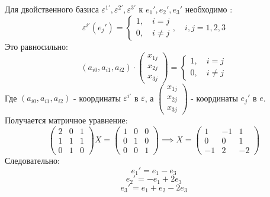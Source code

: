 \documentclass[a4paper]{article}
\newcommand{\mat}[1]{\begin{pmatrix} #1 \end{pmatrix}}
\newcommand{\case}[1]{\begin{cases} #1 \end{cases}}
\begin{document}
\begin{enumerate}
\begin{enumerate}
        Для двойственного базиса $ \varepsilon^{1'}, \varepsilon^{2'}, \varepsilon^{3'} $ к $e_1', e_2', e_3' $ необходимо :
        $$
        \varepsilon^{i'}(e_j') = \case{1, \quad i=j\\0, \quad i\neq j}, \quad i,j = 1, 2, 3
        $$
        Это равносильно:
        $$(a_{i0}, a_{i1}, a_{i2})\cdot \mat{x_{1j}\\x_{2j}\\x_{3j}} = \case{1, \quad i=j\\0, \quad i\neq j}$$
        Где $(a_{i0}, a_{i1}, a_{i2})$ - координаты $\varepsilon^{i'}$ в $\varepsilon$, а $\mat{x_{1j}\\x_{2j}\\x_{3j}}$ - координаты $e_j'$ в $e$. Получается матричное уравнение:
        $$\mat{2&0&1\\1&1&1\\0&1&0}X = \mat{1&0&0\\0&1&0\\0&0&1} \implies X = \mat{1 & -1 & 1 \\
        0 & 0 & 1 \\
        -1 & 2 & -2}$$
        Следовательно:
        $$e_1' = e_1-e_3$$
        $$e_2' = -e_1+2e_3$$
        $$e_3' = e_1+e_2-2e_3$$
    \end{enumerate}


\end{enumerate}
\end{document}
